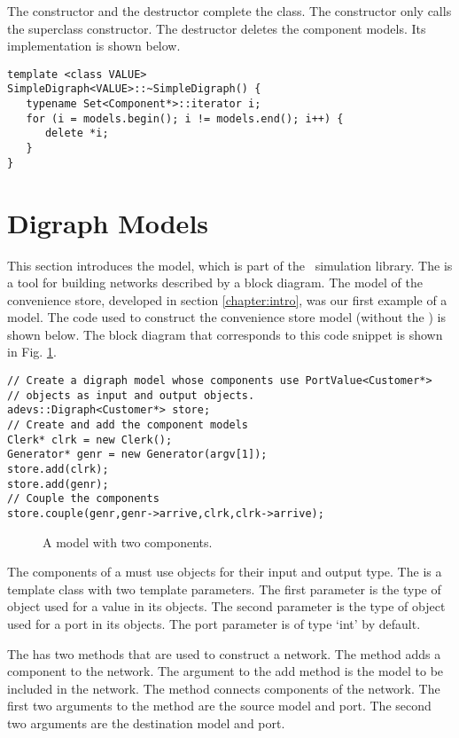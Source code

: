 The constructor and the destructor complete the class. The constructor only calls the superclass constructor. The destructor deletes the component models. Its implementation is shown below.
\begin{verbatim}
template <class VALUE>
SimpleDigraph<VALUE>::~SimpleDigraph() {
   typename Set<Component*>::iterator i;
   for (i = models.begin(); i != models.end(); i++) {
      delete *i;
   }
}
\end{verbatim}
 
\section{Digraph Models}
\label{section:digraph_models}
This section introduces the  model, which is part of the \adevs\ simulation library. The  is a tool for building networks described by a block diagram. The model of the convenience store, developed in section \ref{chapter:intro}, was our first example of a  model. The code used to construct the convenience store model (without the ) is shown below. The block diagram that corresponds to this code snippet is shown in Fig. \ref{fig:two_component_diagram}.
\begin{verbatim}
// Create a digraph model whose components use PortValue<Customer*>
// objects as input and output objects.
adevs::Digraph<Customer*> store;
// Create and add the component models
Clerk* clrk = new Clerk();
Generator* genr = new Generator(argv[1]);
store.add(clrk);
store.add(genr);
// Couple the components
store.couple(genr,genr->arrive,clrk,clrk->arrive);
\end{verbatim}
\begin{figure}[ht]
\centering
{}
\caption{A  model with two components.}
\label{fig:two_component_diagram}
\end{figure}

The components of a  must use  objects for their input and output type. The  is a template class with two template parameters. The first parameter is the type of object used for a value in its  objects. The second parameter is the type of object used for a port in its  objects. The port parameter is of type `int' by default.

The  has two methods that are used to construct a network. The  method adds a component to the network. The argument to the add method is the model to be included in the network. The  method connects components of the network. The first two arguments to the  method are the source model and port. The second two arguments are the destination model and port.
 
